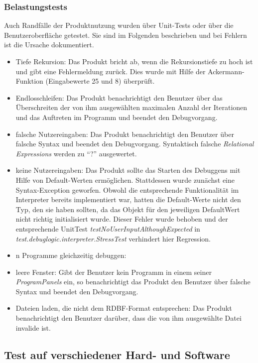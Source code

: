 \documentclass[parskip=full]{scrartcl}
\begin{document}
\subsubsection{Belastungstests} %
\label{stress}
Auch Randfälle der Produktnutzung wurden über Unit-Tests oder über die Benutzeroberfläche getestet. Sie sind im Folgenden beschrieben und bei Fehlern ist die Ursache dokumentiert.
\begin{itemize}
\item Tiefe Rekursion: Das Produkt bricht ab, wenn die Rekursionstiefe zu hoch ist und gibt eine Fehlermeldung zurück. Dies wurde mit Hilfe der Ackermann-Funktion (Eingabewerte 25 und 8) überprüft.
\item Endlosschleifen: Das Produkt benachrichtigt den Benutzer über das Überschreiten der von ihm ausgewählten maximalen Anzahl der Iterationen und das Auftreten im Programm und beendet den Debugvorgang.
\item falsche Nutzereingaben: Das Produkt benachrichtigt den Benutzer über falsche Syntax und beendet den Debugvorgang. Syntaktisch falsche \textit{Relational Expressions} werden zu \enquote{?} ausgewertet.
\item keine Nutzereingaben: Das Produkt sollte das Starten des Debuggens mit Hilfe von Default-Werten ermöglichen. Stattdessen wurde zunächst eine Syntax-Exception geworfen. Obwohl die entsprechende Funktionalität im Interpreter bereits implementiert war, hatten die Default-Werte nicht den Typ, den sie haben sollten, da das Objekt für den jeweiligen DefaultWert nicht richtig initialisiert wurde. Dieser Fehler wurde behoben und der entsprechende UnitTest \textit{testNoUserInputAlthoughExpected} in \textit{test.debuglogic.interpreter.StressTest} verhindert hier Regression.
\item n Programme gleichzeitig debuggen: 
\item leere Fenster: Gibt der Benutzer kein Programm in einem seiner \textit{ProgramPanels} ein, so benachrichtigt das Produkt den Benutzer über falsche Syntax und beendet den Debugvorgang.
\item Dateien laden, die nicht dem RDBF-Format entsprechen: Das Produkt benachrichtigt den Benutzer darüber, dass die von ihm ausgewählte Datei invalide ist.

\end{itemize}

\subsection{Test auf verschiedener Hard- und Software}
\end{document}
